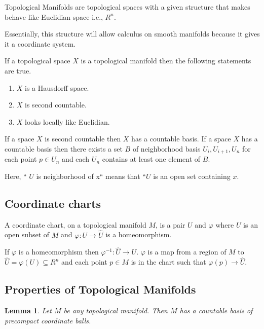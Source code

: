 \documentclass{article}
\newtheorem{lemma}[theorem]{Lemma}
\begin{document}
Topological Manifolds are topological spaces with a given structure that makes behave like Euclidian space i.e., $ R^n $.

Essentially, this structure will allow calculus on smooth manifolds because it gives it a coordinate system.

If a topological space $ X $ is a topological manifold then the following statements are true.

\begin{enumerate}
\item $ X $ is a Hausdorff space.
\item $ X $ is second countable.
\item $ X $ looks locally like Euclidian.
\end{enumerate}

If a space $ X $ is second countable then $ X $ has a countable basis. If a space $ X $ has a countable basis then there exists a set $ B $ of neighborhood basis $ U_{i}, U_{i+1}, U_{n} $ for each point $ p \in U_{n} $ and each $ U_{n} $ contains at least one element of $ B $.

Here, `` $ U $ is neighborhood of x`` means that ``$ U $ is an open set containing $ x $.

\subsection{Coordinate charts}
A coordinate chart, on a topological manifold $ M $, is a pair $ U $ and $ \varphi $ where $ U $ is an open subset of $ M $ and $ \varphi: U \rightarrow \hat{U} $ is a homeomorphism.

If $ \varphi $ is a homeomorphism then $  \varphi^{-1}: \hat{U} \rightarrow U $. $ \varphi $ is a map from a region of $ M $ to  $ \hat{U} = \varphi(U) \subseteq R^n $ and each point $ p \in M $ is in the chart such that $ \varphi(p) \rightarrow \hat{U} $.

\subsection{Properties of Topological Manifolds}
\begin{lemma}
Let $ M $ be any topological manifold. Then $ M $ has a countable basis of precompact coordinate balls.
\end{lemma}
\end{document}
